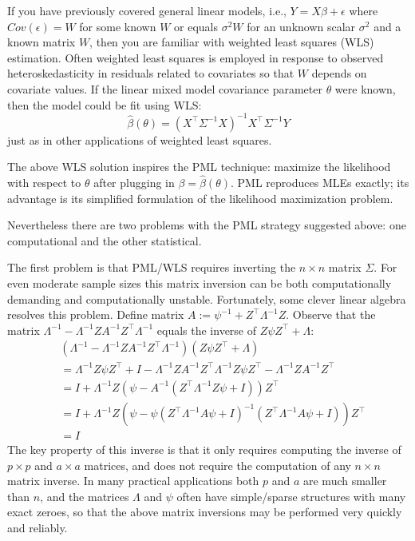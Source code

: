 \documentclass[
]{book}
\begin{document}
If you have previously covered general linear models, i.e., \(Y = X\beta + \epsilon\) where \(Cov(\epsilon) = W\) for some known \(W\) or equals \(\sigma^2 W\) for an unknown scalar \(\sigma^2\) and a known matrix \(W\), then you are familiar with weighted least squares (WLS) estimation. Often weighted least squares is employed in response to observed heteroskedasticity in residuals related to covariates so that \(W\) depends on covariate values. If the linear mixed model covariance parameter \(\theta\) were known, then the model could be fit using WLS:
\[\hat\beta(\theta) = (X^\top \Sigma^{-1}X)^{-1}X^\top \Sigma^{-1}Y\]
just as in other applications of weighted least squares.

The above WLS solution inspires the PML technique: maximize the likelihood with respect to \(\theta\) after plugging in \(\beta = \hat\beta(\theta)\). PML reproduces MLEs exactly; its advantage is its simplified formulation of the likelihood maximization problem.

Nevertheless there are two problems with the PML strategy suggested above: one computational and the other statistical.

The first problem is that PML/WLS requires inverting the \(n\times n\) matrix \(\Sigma\). For even moderate sample sizes this matrix inversion can be both computationally demanding and computationally unstable. Fortunately, some clever linear algebra resolves this problem. Define matrix \(A:=\psi^{-1} + Z^\top \Lambda^{-1}Z\). Observe that the matrix \(\Lambda^{-1} - \Lambda^{-1}ZA^{-1}Z^\top \Lambda^{-1}\) equals the inverse of \(Z\psi Z^\top + \Lambda\):
\begin{align*}
&(\Lambda^{-1} - \Lambda^{-1}ZA^{-1}Z^\top \Lambda^{-1})(Z\psi Z^\top + \Lambda) \\
& = \Lambda^{-1}Z\psi Z^\top + I - \Lambda^{-1}ZA^{-1}Z^\top \Lambda^{-1}Z\psi Z^\top - \Lambda^{-1}ZA^{-1}Z^\top \\
& = I + \Lambda^{-1}Z(\psi - A^{-1}(Z^\top \Lambda^{-1}Z\psi + I))Z^\top \\
& = I+\Lambda^{-1}Z(\psi - \psi(Z^\top \Lambda^{-1}A\psi + I)^{-1}(Z^\top \Lambda^{-1}A\psi + I))Z^\top \\
& = I
\end{align*}
The key property of this inverse is that it only requires computing the inverse of \(p\times p\) and \(a\times a\) matrices, and does not require the computation of any \(n\times n\) matrix inverse. In many practical applications both \(p\) and \(a\) are much smaller than \(n\), and the matrices \(\Lambda\) and \(\psi\) often have simple/sparse structures with many exact zeroes, so that the above matrix inversions may be performed very quickly and reliably.
\end{document}
